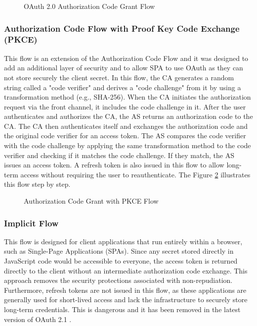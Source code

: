\documentclass[../memoire.tex]{subfiles}
\begin{document}
\begin{figure}[htp]
  \centering
  
  \caption{OAuth 2.0 Authorization Code Grant Flow \cite[p.~23]{richer2017}}
  \label{oauth_code_grant}
\end{figure}

\subsubsection*{Authorization Code Flow with Proof Key Code Exchange (PKCE)}\label{sec:pkce}

This flow is an extension of the Authorization Code Flow and it was designed to add an additional layer of security and to allow SPA to use OAuth as they can not store securely the client secret. In this flow, the CA generates a random string called a "code verifier" and derives a "code challenge" from it by using a transformation method (e.g., SHA-256). When the CA initiates the authorization request via the front channel, it includes the code challenge in it. After the user authenticates and authorizes the CA, the AS returns an authorization code to the CA. The CA then authenticates itself and exchanges the authorization code and the original code verifier for an access token. The AS compares the code verifier with the code challenge by applying the same transformation method to the code verifier and checking if it matches the code challenge. If they match, the AS issues an access token. A refresh token is also issued in this flow to allow long-term access without requiring the user to reauthenticate. The Figure \ref{pkce_flow} illustrates this flow step by step.

\begin{figure}[htp]
  \centering
  
  \caption{Authorization Code Grant with PKCE Flow \cite[p.~177]{richer2017}}
  \label{pkce_flow}
\end{figure}

\subsubsection*{Implicit Flow}

This flow is designed for client applications that run entirely within a browser, such as Single-Page Applications (SPAs). Since any secret stored directly in JavaScript code would be accessible to everyone, the access token is returned directly to the client without an intermediate authorization code exchange. This approach removes the security protections associated with non-repudiation. Furthermore, refresh tokens are not issued in this flow, as these applications are generally used for short-lived access and lack the infrastructure to securely store long-term credentials. This is dangerous and it has been removed in the latest version of OAuth 2.1 \cite[p.~116]{wilson2022}\cite{rfc9700}.
\end{document}
